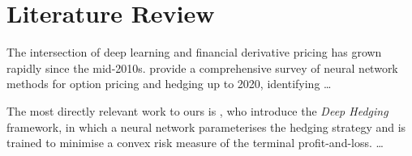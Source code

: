 %
%

\section{Literature Review}
\label{sec:litreview}

The intersection of deep learning and financial derivative pricing has grown rapidly
since the mid-2010s. \citet{RufWang2020} provide a comprehensive survey of neural
network methods for option pricing and hedging up to 2020, identifying \ldots

The most directly relevant work to ours is \citet{BuehlerEtAl2019}, who introduce the
\emph{Deep Hedging} framework, in which a neural network parameterises the hedging
strategy and is trained to minimise a convex risk measure of the terminal
profit-and-loss. \ldots

